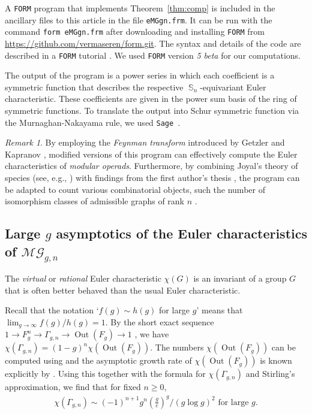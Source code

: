 \documentclass[oneside]{amsart}
\theoremstyle{remark}
\newtheorem{remark}[theorem]{Remark}
\DeclareMathOperator{\SG}{{\mathbb S}}
\newcommand{\Out}{{\operatorname{Out}}}
\newcommand{\MG}{\mathcal{MG}}
\begin{document}
A \texttt{FORM} program that implements Theorem~\ref{thm:comp} is included in the ancillary files to this article in the file \texttt{eMGgn.frm}. It can be run with the command \texttt{form eMGgn.frm} after downloading and installing \texttt{FORM} from \url{https://github.com/vermaseren/form.git}. The syntax and details of the code are described in a \texttt{FORM} tutorial \cite{FORMcourse}. We used  \texttt{FORM} version \emph{5 beta} for our computations.

The output of the program is a power series in which each coefficient is a symmetric function that describes the respective $\SG_n$-equivariant Euler characteristic. These coefficients are given in the power sum basis of the ring of symmetric functions.
To translate the output into Schur symmetric function via the Murnaghan-Nakayama rule, we used  \texttt{Sage}~\cite{sagemath}. 

\begin{remark}
By employing the \emph{Feynman transform} introduced by Getzler and Kapranov \cite{getzler1998modular}, modified versions of this program can effectively compute the Euler characteristics of \emph{modular operads}. Furthermore, by combining Joyal's theory of species (see, e.g., \cite{BLL}) with findings from the first author's thesis \cite{Borinsky:2018mdl}, the program can be adapted to count various combinatorial objects, such the number of isomorphism classes of admissible graphs of rank $n$ \cite{OEIS}.
\end{remark}

\subsection{Large \texorpdfstring{$g$}{g} asymptotics of the Euler characteristics of \texorpdfstring{$\MG_{g,n}$}{MGgn}}
\label{sec:asy}
%
The \emph{virtual} or \emph{rational} Euler characteristic $\chi(G)$ is an 
invariant of a group $G$ that is often better behaved than the usual Euler characteristic. %

Recall that the notation `$f(g) \sim h(g)$ for large $g$' means that $\lim_{g\rightarrow \infty} f(g)/h(g) = 1$.
By the short exact sequence 
$1 \rightarrow F_g^n \rightarrow \Gamma_{g,n} \rightarrow \Out(F_{g}) \rightarrow 1$ \cite{conant2016assembling}, we have $\chi(\Gamma_{g,n}) = (1-g)^n \chi(\Out(F_{g}))$.
The numbers $\chi(\Out(F_{g}))$ can be computed using \cite[Proposition 8.5]{BV} and 
the asymptotic growth rate of $\chi(\Out(F_{g}))$ is known explicitly by \cite[Theorem~A]{BV}. Using this together with the formula for $\chi(\Gamma_{g,n})$ and Stirling's approximation, we find that for fixed $n \geq 0$,
\begin{align*} \chi(\Gamma_{g,n}) \sim (-1)^{n+1} g^{n} \left( \frac{g}{e}\right)^g / (g\log g)^2 \text{ for large } g.  \end{align*}
\end{document}
